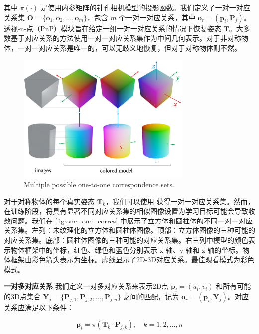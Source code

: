 其中 $\pi(\cdot)$ 是使用内参矩阵的针孔相机模型的投影函数。我们定义了一对一对应关系集 $\mathbf{O} = \{\mathbf{o}_1, \mathbf{o}_2, ..., \mathbf{o}_m\}$，包含 $m$ 个一对一对应关系，其中 $\mathbf{o}_r = (\mathbf{p}_i, \mathbf{P}_j)$。透视-n-点（PnP）模块旨在给定一组一对一对应关系的情况下恢复姿态 $\mathbf{T}$。大多数基于对应关系的方法使用一对一对应关系集作为中间几何表示。对于非对称物体，一对一对应关系是唯一的，可以无歧义地恢复，但对于对称物体则不然。

\begin{figure}[ht]
  \centerline{\includegraphics[width=0.75\textwidth]{figure/symnet/one-to_one-correspondence.jpg}}
  \caption{Multiple possible one-to-one correspondence sets.}
  \label{fig:one_one_corres}
\end{figure}

对于对称物体的每个真实姿态 $\mathbf{T}_k$，我们可以使用  获得一对一对应关系集。然而，在训练阶段，将具有显著不同对应关系集的相似图像设置为学习目标可能会导致收敛问题。我们在 \autoref{fig:one_one_corres} 中展示了立方体和圆柱体的不同一对一对应关系集。左列：未纹理化的立方体和圆柱体图像。顶部：立方体图像的三种可能的对应关系集。底部：圆柱体图像的三种可能的对应关系集。右三列中模型的颜色表示物体框架中的坐标，红色、绿色和蓝色分别表示 x 轴、y 轴和 z 轴的坐标。物体框架由彩色箭头表示为坐标。虚线显示了2D-3D对应关系。最佳观看模式为彩色模式。

\textbf{一对多对应关系 } 我们定义一对多对应关系来表示2D点 $\mathbf{p}_i=(u_i,v_i)$ 和所有可能的3D点集合 $\mathbf{Y}_j = \{\mathbf{P}_{j,1}, \mathbf{P}_{j,2}, ..., \mathbf{P}_{j,n}\}$ 之间的匹配，记为 $\mathbf{o}_r = (\mathbf{p}_i, \mathbf{Y}_j)$。对应关系应满足以下条件：

\begin{equation}
\mathbf{p}_i = \pi(\mathbf{T}_k \cdot \mathbf{P}_{j,k}), \quad k = 1,2,...,n
\label{eq:projection_one_to_many}
\end{equation}

